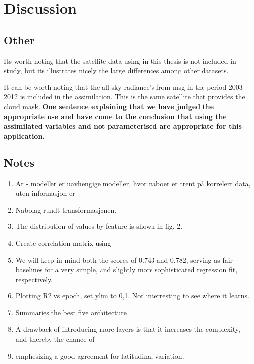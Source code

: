 \chapter{Discussion}
\section{Other}
Its worth noting that the satellite data using in this thesis is not included in  \citeauthor{Stubenrauch2013AssessmentPanel} study, but its illustrates nicely the large differences among other datasets. 

It can be worth noting that the all sky radiance's from \acrfull{msg} in the period 2003-2012 is included in the assimilation. This is the same satellite that provides the cloud mask. 
\textbf{One sentence explaining that we have judged the appropriate use and have come to the conclusion that using the assimilated variables and not parameterised are appropriate for this application.}

\section{Notes}
\begin{enumerate}
    \item Ar - modeller er uavhengige modeller, hvor naboer er trent på korrelert data, uten informasjon er
    \item Nabolag rundt transformasjonen. 
    \item The distribution of values
    by feature is shown in fig. 2.
    \item Create correlation matrix using 
    \item We will keep in mind both the scores of 0.743 and 0.782, serving
    as fair baselines for a very simple, and slightly more sophisticated
    regression fit, respectively.
    \item Plotting R2 vs epoch, set ylim to 0,1. Not interresting to see where it learns.
    \item Summaries the best five architecture 
    \item A drawback of introducing more layers
    is that it increases the complexity, and thereby the chance of
    \item emphesizing a good agreement for latitudinal variation.
\end{enumerate}

